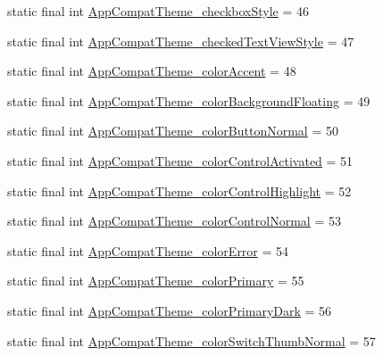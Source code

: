 \begin{DoxyCompactItemize}
\item 
static final int \mbox{\hyperlink{classandroid_1_1support_1_1v7_1_1appcompat_1_1R_1_1styleable_ada4b0b595cec8ec5a840ac248c86755e}{App\+Compat\+Theme\+\_\+checkbox\+Style}} = 46
\item 
static final int \mbox{\hyperlink{classandroid_1_1support_1_1v7_1_1appcompat_1_1R_1_1styleable_ab350011c7d2324d433bb85860f934f39}{App\+Compat\+Theme\+\_\+checked\+Text\+View\+Style}} = 47
\item 
static final int \mbox{\hyperlink{classandroid_1_1support_1_1v7_1_1appcompat_1_1R_1_1styleable_a0cd7e26f664fcb4b1b0a43233a91081a}{App\+Compat\+Theme\+\_\+color\+Accent}} = 48
\item 
static final int \mbox{\hyperlink{classandroid_1_1support_1_1v7_1_1appcompat_1_1R_1_1styleable_a8d08cfe8d4c9faf074f5234cd092cf03}{App\+Compat\+Theme\+\_\+color\+Background\+Floating}} = 49
\item 
static final int \mbox{\hyperlink{classandroid_1_1support_1_1v7_1_1appcompat_1_1R_1_1styleable_a51f631549bca57671c531469731bb198}{App\+Compat\+Theme\+\_\+color\+Button\+Normal}} = 50
\item 
static final int \mbox{\hyperlink{classandroid_1_1support_1_1v7_1_1appcompat_1_1R_1_1styleable_a28584cdf55e54e1e8c7a1ac93734da0a}{App\+Compat\+Theme\+\_\+color\+Control\+Activated}} = 51
\item 
static final int \mbox{\hyperlink{classandroid_1_1support_1_1v7_1_1appcompat_1_1R_1_1styleable_a353fb429ce2fe154c7531e98d327eb5c}{App\+Compat\+Theme\+\_\+color\+Control\+Highlight}} = 52
\item 
static final int \mbox{\hyperlink{classandroid_1_1support_1_1v7_1_1appcompat_1_1R_1_1styleable_a4bc4872d61206618aeabe28880c6402f}{App\+Compat\+Theme\+\_\+color\+Control\+Normal}} = 53
\item 
static final int \mbox{\hyperlink{classandroid_1_1support_1_1v7_1_1appcompat_1_1R_1_1styleable_afac8120025ab1795760b42e662f83c60}{App\+Compat\+Theme\+\_\+color\+Error}} = 54
\item 
static final int \mbox{\hyperlink{classandroid_1_1support_1_1v7_1_1appcompat_1_1R_1_1styleable_a08b3d2406679170d65c83db4b08211e6}{App\+Compat\+Theme\+\_\+color\+Primary}} = 55
\item 
static final int \mbox{\hyperlink{classandroid_1_1support_1_1v7_1_1appcompat_1_1R_1_1styleable_af2ef6915870572b1e457d6961dce8f9a}{App\+Compat\+Theme\+\_\+color\+Primary\+Dark}} = 56
\item 
static final int \mbox{\hyperlink{classandroid_1_1support_1_1v7_1_1appcompat_1_1R_1_1styleable_a4a54d43ed55ed2c6a48476ab524d2ec6}{App\+Compat\+Theme\+\_\+color\+Switch\+Thumb\+Normal}} = 57

\end{DoxyCompactItemize}
